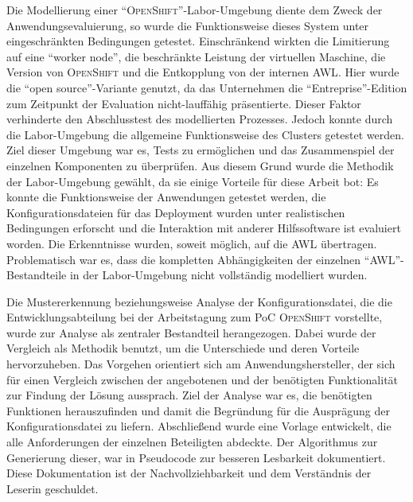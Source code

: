 Die Modellierung einer \enquote{\textsc{OpenShift}}-Labor-Umgebung diente dem Zweck der Anwendungsevaluierung, so wurde die Funktionsweise dieses System unter eingeschränkten Bedingungen getestet. Einschränkend wirkten die Limitierung auf eine \enquote{worker node}, die beschränkte Leistung der virtuellen Maschine, die Version von \textsc{OpenShift} und die Entkopplung von der internen \ac{AWL}. Hier wurde die \enquote{open source}-Variante genutzt, da das Unternehmen die \enquote{Entreprise}-Edition zum Zeitpunkt der Evaluation nicht-lauffähig präsentierte. Dieser Faktor verhinderte den Abschlusstest des modellierten Prozesses. Jedoch konnte durch die Labor-Umgebung die allgemeine Funktionsweise des Clusters getestet werden. Ziel dieser Umgebung war es, Tests zu ermöglichen und das Zusammenspiel der einzelnen Komponenten zu überprüfen. Aus diesem Grund wurde die Methodik der Labor-Umgebung gewählt, da sie einige Vorteile für diese Arbeit bot: Es konnte die Funktionsweise der Anwendungen getestet werden, die Konfigurationsdateien für das Deployment wurden unter realistischen Bedingungen erforscht und die Interaktion mit anderer Hilfssoftware ist evaluiert worden. Die Erkenntnisse wurden, soweit möglich, auf die \ac{AWL} übertragen. Problematisch war es, dass die kompletten Abhängigkeiten der einzelnen \enquote{\ac{AWL}}-Bestandteile in der Labor-Umgebung nicht vollständig modelliert wurden.
\par
Die Mustererkennung beziehungsweise Analyse der Konfigurationsdatei, die die Entwicklungsabteilung bei der Arbeitstagung zum \ac{PoC} \textsc{OpenShift} vorstellte, wurde zur Analyse als zentraler Bestandteil herangezogen. Dabei wurde der Vergleich als Methodik benutzt, um die Unterschiede und deren Vorteile hervorzuheben. Das Vorgehen orientiert sich am Anwendungshersteller, der sich für einen Vergleich zwischen der angebotenen und der benötigten Funktionalität zur Findung der Lösung aussprach.\autocite[vgl.][Application\,$\rightarrow$\,Deployments]{red_hat_inc_okd_2019} Ziel der Analyse war es, die benötigten Funktionen herauszufinden und damit die Begründung für die Ausprägung der Konfigurationsdatei zu liefern. Abschließend wurde eine Vorlage entwickelt, die alle Anforderungen der einzelnen Beteiligten abdeckte. Der Algorithmus zur Generierung dieser, war in Pseudocode zur besseren Lesbarkeit dokumentiert. Diese Dokumentation ist der Nachvollziehbarkeit und dem Verständnis der Leserin geschuldet.
\par
